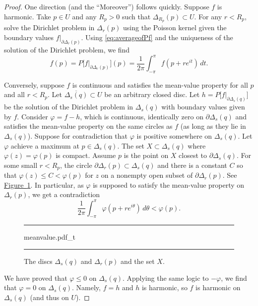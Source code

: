 \documentclass[12pt,openany]{book}
\newcommand{\myquote}[1]{``#1''}
\theoremstyle{plain}
\theoremstyle{remark}
\theoremstyle{definition}
\newenvironment{myfig}{%
\begin{figure}[h!t]
\noindent\rule{\textwidth}{0.5pt}\vspace{12pt}\par\centering}%
{\par\noindent\rule{\textwidth}{0.5pt}
\end{figure}}
\theoremstyle{exercise}
\theoremstyle{example}
\newcommand{\figureref}[1]{\hyperref[#1]{Figure~\ref*{#1}}}
\begin{document}
\begin{proof}
One direction (and the \myquote{Moreover}) follows quickly.
Suppose $f$ is harmonic.
Take $p \in U$ and
any $R_p > 0$ such that $\Delta_{R_p}(p) \subset U$.
For any $r < R_p$,
solve the Dirichlet problem in $\Delta_r(p)$ using the Poisson kernel
given the boundary values
$f|_{\partial \Delta_r(p)}$.  Using \eqref{eq:averageofPf} and the
uniqueness of the solution of the Dirichlet problem, we find
\begin{equation*}
f(p) = P\bigl[f|_{\partial \Delta_r(p)}\big](p) =
\frac{1}{2\pi} \int_{-\pi}^{\pi}f(p + r e^{it}) \, dt .
\end{equation*}

Conversely, suppose $f$ is continuous and satisfies the
mean-value property for all $p$ and all $r < R_p$.
Let $\overline{\Delta_s(q)} \subset U$ be an
arbitrary closed disc.  Let $h = P\bigl[f|_{\partial \Delta_s(q)}\big]$
be the solution of the Dirichlet problem in $\Delta_s(q)$ with boundary
values given by $f$.  Consider $\varphi = f-h$,
which is continuous, identically zero
on $\partial \Delta_s(q)$ and satisfies the mean-value property
on the same circles as $f$ (as long as they lie in $\Delta_s(q)$).
Suppose for contradiction that $\varphi$ is positive
somewhere on $\Delta_s(q)$.
Let $\varphi$ achieve a maximum at $p \in
\Delta_s(q)$.
The set $X \subset \Delta_s(q)$ where $\varphi(z) = \varphi(p)$ is compact.
Assume $p$ is the point on $X$ closest to
$\partial \Delta_s(q)$.  For some small $r < R_p$, the circle
$\partial \Delta_r(p) \subset \Delta_s(q)$ and there is a constant
$C$ so that $\varphi(z) \leq C < \varphi(p)$ for $z$
on a nonempty open subset
of $\partial \Delta_r(p)$.  See \figureref{fig:meanvalue}.
In particular, as 
$\varphi$ is supposed to satisfy the
mean-value property on $\Delta_r(p)$, we get a contradiction
\begin{equation*}
\frac{1}{2\pi} \int_{-\pi}^{\pi} \varphi(p+re^{i\theta})\, d\theta <
\varphi(p) .
\end{equation*}

\begin{myfig}
{meanvalue.pdf_t}
\caption{The discs $\Delta_s(q)$ and $\Delta_r(p)$ and the set
$X$.\label{fig:meanvalue}}
\end{myfig}

We have proved that $\varphi \leq 0$ on $\Delta_s(q)$.  Applying the same
logic to $-\varphi$, we find that $\varphi = 0$ on $\Delta_s(q)$.
Namely, $f=h$ and $h$ is harmonic, so $f$ is harmonic on
$\Delta_s(q)$ (and thus on $U$).
\end{proof}
\end{document}
